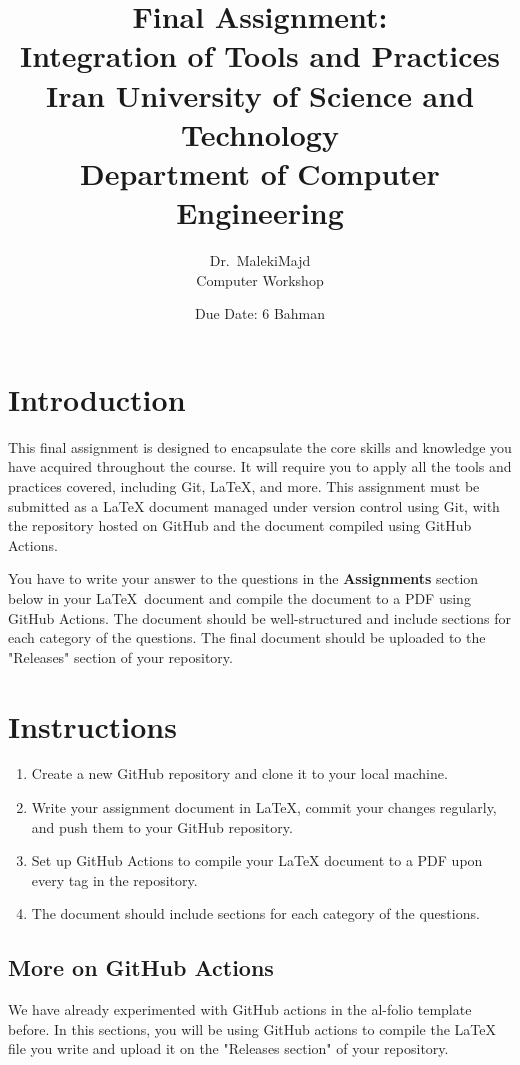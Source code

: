 \documentclass[12pt]{article}
\title{
    \vspace{2in}
    \textbf{Final Assignment:}\\
    \textbf{Integration of Tools and Practices}\\
    \large Iran University of Science and Technology\\
    \large Department of Computer Engineering\\
    \vspace{2in}
}
\author{
    \vspace{0.5in}
    Dr.\ MalekiMajd\\
    Computer Workshop\\
    \vspace{0.5in}
}
\date{Due Date: 6 Bahman}
\begin{document}
\begin{titlepage}
    \maketitle
    \thispagestyle{empty}
\end{titlepage}

\newpage

\section*{Introduction}
This final assignment is designed to encapsulate the core skills and knowledge you have acquired throughout the course. It will require you to apply all the tools and practices covered, including Git, LaTeX, and more. This assignment must be submitted as a LaTeX document managed under version control using Git, with the repository hosted on GitHub and the document compiled using GitHub Actions.

You have to write your answer to the questions in the \textbf{Assignments} section below in your \LaTeX\ document and compile the document to a PDF using GitHub Actions. The document should be well-structured and include sections for each category of the questions. The final document should be uploaded to the "Releases" section of your repository.

\section*{Instructions}
\begin{enumerate}
    \item Create a new GitHub repository and clone it to your local machine.
    \item Write your assignment document in LaTeX, commit your changes regularly, and push them to your GitHub repository.
    \item Set up GitHub Actions to compile your LaTeX document to a PDF upon every tag in the repository.
    \item The document should include sections for each category of the questions.
\end{enumerate}

\subsection*{More on GitHub Actions}
We have already experimented with GitHub actions in the al-folio template before. In this sections, you will be using GitHub actions to compile the LaTeX file you write and upload it on the "Releases section" of your repository.
\end{document}
